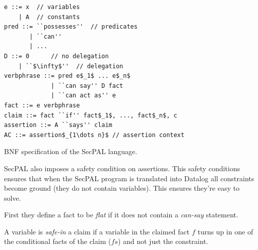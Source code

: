 \documentclass[a4paper]{article}
\begin{document}
\begin{marginfigure}
  \begin{lstlisting}[language=BNF]
e ::= x  // variables
    | A  // constants
pred ::= ``possesses''  // predicates
       | ``can'' 
       | ... 
D ::= 0      // no delegation
    | ``$\infty$''  // delegation
verbphrase ::= pred e$_1$ ... e$_n$  
             | ``can say'' D fact 
             | ``can act as'' e
fact ::= e verbphrase
claim ::= fact ``if'' fact$_1$, ..., fact$_n$, c 
assertion ::= A ``says'' claim
AC ::= assertion$_{1\dots n}$ // assertion context
  \end{lstlisting}
  \caption{BNF specification of the SecPAL language.}
\label{secpal:grammar}
\end{marginfigure}

SecPAL also imposes a safety condition on assertions.  This safety conditions
ensures that when the SecPAL program is translated into Datalog all constraints
become ground (they do not contain variables).  This ensures they're easy to
solve. 

First they define a fact to be \emph{flat} if it does not contain a
\emph{can-say} statement.

\DontPrintSemicolon
{}
\begin{algorithm}[H]
\end{algorithm}

A variable is \emph{safe-in} a claim if a variable in the claimed fact $f$ turns up in one of the
conditional facts of the claim ($fs$) and not just the constraint.
\end{document}
